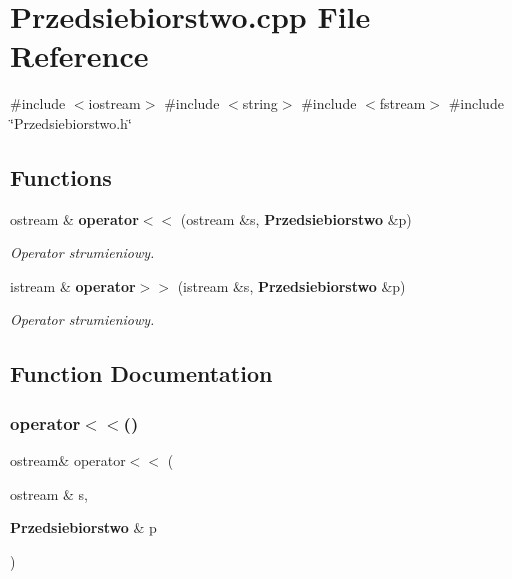 \section{Przedsiebiorstwo.\+cpp File Reference}
\label{_przedsiebiorstwo_8cpp}
{\ttfamily \#include $<$iostream$>$}\newline
{\ttfamily \#include $<$string$>$}\newline
{\ttfamily \#include $<$fstream$>$}\newline
{\ttfamily \#include \char`\"{}Przedsiebiorstwo.\+h\char`\"{}}\newline
\subsection*{Functions}
\begin{DoxyCompactItemize}
\item 
ostream \& \textbf{ operator$<$$<$} (ostream \&s, \textbf{ Przedsiebiorstwo} \&p)
\begin{DoxyCompactList}\small\item\em Operator strumieniowy. \end{DoxyCompactList}\item 
istream \& \textbf{ operator$>$$>$} (istream \&s, \textbf{ Przedsiebiorstwo} \&p)
\begin{DoxyCompactList}\small\item\em Operator strumieniowy. \end{DoxyCompactList}\end{DoxyCompactItemize}


\subsection{Function Documentation}
\mbox{\label{_przedsiebiorstwo_8cpp_a1c4af9010b5f2325f11a349a702c78ef}} 
\subsubsection{operator$<$$<$()}
{\footnotesize\ttfamily ostream\& operator$<$$<$ (\begin{DoxyParamCaption}\item[{ostream \&}]{s,  }\item[{\textbf{ Przedsiebiorstwo} \&}]{p }\end{DoxyParamCaption})}



